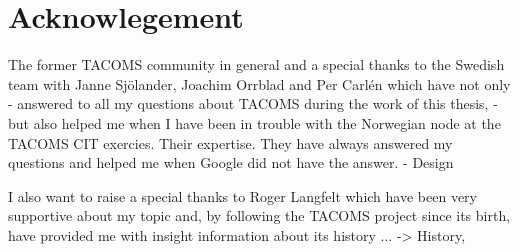 \chapter*{Acknowlegement}
The former TACOMS community in general and a special thanks to the Swedish team with Janne Sjölander, Joachim Orrblad and Per Carlén which have not only 
- answered to all my questions about TACOMS during the work of this thesis, 
- but also helped me when I have been in trouble with the Norwegian node at the TACOMS CIT exercies. Their expertise. They have always answered my questions and helped me when Google did not have the answer. 
- Design

I also want to raise a special thanks to Roger Langfelt which have been very supportive about my topic and, by following the TACOMS project since its birth, have provided me with insight information about its history ... -> History, 
